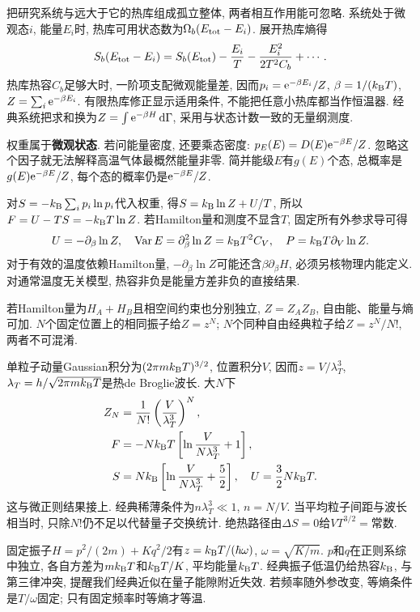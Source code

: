 \label{ch:canonical}
把研究系统与远大于它的热库组成孤立整体, 两者相互作用能可忽略. 系统处于微观态$i$, 能量$E_i$时, 热库可用状态数为$\Omega_b(E_{\rm tot}-E_i)$. 展开热库熵得
\[
S_b(E_{\rm tot}-E_i)=S_b(E_{\rm tot})-\frac{E_i}{T}
-\frac{E_i^2}{2T^2 C_b}+\cdots.
\]
热库热容$C_b$足够大时, 一阶项支配微观能量差, 因而$p_i=\mathrm e^{-\beta E_i}/Z$, $\beta=1/(k_{\mathrm B} T)$, $Z=\sum_i\mathrm e^{-\beta E_i}$. 有限热库修正显示适用条件, 不能把任意小热库都当作恒温器. 经典系统把求和换为$Z=\int\mathrm e^{-\beta H}\,\mathrm d\Gamma$, 采用与状态计数一致的无量纲测度.

权重属于\textbf{微观状态}. 若问能量密度, 还要乘态密度: $p_E(E)=D(E)\mathrm e^{-\beta E}/Z$. 忽略这个因子就无法解释高温气体最概然能量非零. 简并能级$E$有$g(E)$个态, 总概率是$g(E)\mathrm e^{-\beta E}/Z$, 每个态的概率仍是$\mathrm e^{-\beta E}/Z$.

对$S=-k_{\mathrm B}\sum_i p_i\ln p_i$代入权重, 得$S=k_{\mathrm B}\ln Z+U/T$, 所以$F=U-TS=-k_{\mathrm B} T\ln Z$. 若Hamilton量和测度不显含$T$, 固定所有外参求导可得
\[
U=-\partial_\beta\ln Z,\quad
\operatorname{Var} E=\partial_\beta^2\ln Z=k_{\mathrm B} T^2 C_V,\quad
P=k_{\mathrm B} T\partial_V\ln Z.
\]
对于有效的温度依赖Hamilton量, $-\partial_\beta\ln Z$可能还含$\beta\partial_\beta H$, 必须另核物理内能定义. 对通常温度无关模型, 热容非负是能量方差非负的直接结果.

若Hamilton量为$H_A+H_B$且相空间约束也分别独立, $Z=Z_AZ_B$, 自由能、能量与熵可加. $N$个固定位置上的相同振子给$Z=z^N$; $N$个同种自由经典粒子给$Z=z^N/N!$, 两者不可混淆.

单粒子动量Gaussian积分为$(2\pi mk_{\mathrm B} T)^{3/2}$, 位置积分$V$, 因而$z=V/\lambda_T^3$, $\lambda_T=h/\sqrt{2\pi mk_{\mathrm B} T}$是热de Broglie波长. 大$N$下
\[
\begin{aligned}
Z_N&=\frac1{N!}\left(\frac V{\lambda_T^3}\right)^N,\\
F&=-Nk_{\mathrm B} T\left[\ln\frac V{N\lambda_T^3}+1\right],\\
S&=Nk_{\mathrm B}\left[\ln\frac V{N\lambda_T^3}+\frac52\right],\quad
U=\frac32Nk_{\mathrm B} T.
\end{aligned}
\]
这与微正则结果接上. 经典稀薄条件为$n\lambda_T^3\ll1$, $n=N/V$. 当平均粒子间距与波长相当时, 只除$N!$仍不足以代替量子交换统计. 绝热路径由$\Delta S=0$给$VT^{3/2}=\text{常数}$.

固定振子$H=p^2/(2m)+Kq^2/2$有$z=k_{\mathrm B} T/(\hbar\omega)$, $\omega=\sqrt{K/m}$. $p$和$q$在正则系综中独立, 各自方差为$mk_{\mathrm B} T$和$k_{\mathrm B} T/K$, 平均能量$k_{\mathrm B} T$. 经典振子低温仍给热容$k_{\mathrm B}$, 与第三律冲突, 提醒我们经典近似在量子能隙附近失效. 若频率随外参改变, 等熵条件是$T/\omega$固定; 只有固定频率时等熵才等温.

